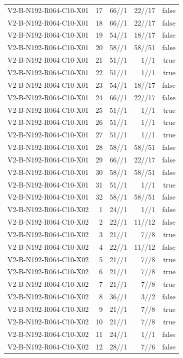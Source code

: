 {\begin{longtable}{lrrrr}
V2-B-N192-R064-C10-X01 & 17 & 66//1 & 22//17 & false \\
V2-B-N192-R064-C10-X01 & 18 & 66//1 & 22//17 & false \\
V2-B-N192-R064-C10-X01 & 19 & 54//1 & 18//17 & false \\
V2-B-N192-R064-C10-X01 & 20 & 58//1 & 58//51 & false \\
V2-B-N192-R064-C10-X01 & 21 & 51//1 & 1//1 & true \\
V2-B-N192-R064-C10-X01 & 22 & 51//1 & 1//1 & true \\
V2-B-N192-R064-C10-X01 & 23 & 54//1 & 18//17 & false \\
V2-B-N192-R064-C10-X01 & 24 & 66//1 & 22//17 & false \\
V2-B-N192-R064-C10-X01 & 25 & 51//1 & 1//1 & true \\
V2-B-N192-R064-C10-X01 & 26 & 51//1 & 1//1 & true \\
V2-B-N192-R064-C10-X01 & 27 & 51//1 & 1//1 & true \\
V2-B-N192-R064-C10-X01 & 28 & 58//1 & 58//51 & false \\
V2-B-N192-R064-C10-X01 & 29 & 66//1 & 22//17 & false \\
V2-B-N192-R064-C10-X01 & 30 & 58//1 & 58//51 & false \\
V2-B-N192-R064-C10-X01 & 31 & 51//1 & 1//1 & true \\
V2-B-N192-R064-C10-X01 & 32 & 58//1 & 58//51 & false \\
V2-B-N192-R064-C10-X02 & 1 & 24//1 & 1//1 & false \\
V2-B-N192-R064-C10-X02 & 2 & 22//1 & 11//12 & false \\
V2-B-N192-R064-C10-X02 & 3 & 21//1 & 7//8 & true \\
V2-B-N192-R064-C10-X02 & 4 & 22//1 & 11//12 & false \\
V2-B-N192-R064-C10-X02 & 5 & 21//1 & 7//8 & true \\
V2-B-N192-R064-C10-X02 & 6 & 21//1 & 7//8 & true \\
V2-B-N192-R064-C10-X02 & 7 & 21//1 & 7//8 & true \\
V2-B-N192-R064-C10-X02 & 8 & 36//1 & 3//2 & false \\
V2-B-N192-R064-C10-X02 & 9 & 21//1 & 7//8 & true \\
V2-B-N192-R064-C10-X02 & 10 & 21//1 & 7//8 & true \\
V2-B-N192-R064-C10-X02 & 11 & 24//1 & 1//1 & false \\
V2-B-N192-R064-C10-X02 & 12 & 28//1 & 7//6 & false \\

\end{longtable}}
